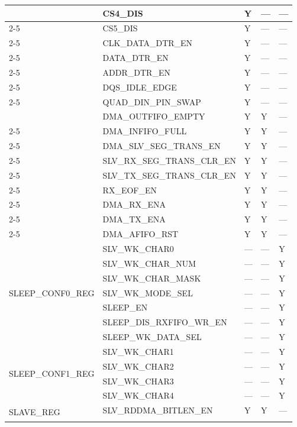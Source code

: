 \documentclass[main\_\_EN.tex]{subfiles}
\begin{document}
\begin{longtable}{|p{4.0cm}|p{6.5cm}|p{1.5cm}|p{1.5cm}|p{1.5cm}|}
& CS4\_DIS & Y & --- & --- \\ \cline{2-5}
& CS5\_DIS & Y & --- & --- \\ \cline{2-5}
& CLK\_DATA\_DTR\_EN & Y & --- & --- \\  \cline{2-5}
& DATA\_DTR\_EN & Y & --- & --- \\ \cline{2-5}
& ADDR\_DTR\_EN & Y & --- & --- \\ \cline{2-5}
& DQS\_IDLE\_EDGE & Y & --- & --- \\ \cline{2-5}
& QUAD\_DIN\_PIN\_SWAP & Y & --- & --- \\ \hline
\clearpage
\multirow{9}{*}{DMA\_CONF\_REG} & DMA\_OUTFIFO\_EMPTY & Y & Y & --- \\ \cline{2-5}
& DMA\_INFIFO\_FULL & Y & Y & --- \\ \cline{2-5}
& DMA\_SLV\_SEG\_TRANS\_EN & Y & Y & --- \\ \cline{2-5}
& SLV\_RX\_SEG\_TRANS\_CLR\_EN & Y & Y & --- \\ \cline{2-5}
& SLV\_TX\_SEG\_TRANS\_CLR\_EN & Y & Y & --- \\ \cline{2-5}
& RX\_EOF\_EN & Y & Y & --- \\ \cline{2-5}
& DMA\_RX\_ENA & Y & Y & --- \\ \cline{2-5}
& DMA\_TX\_ENA & Y & Y & --- \\ \cline{2-5}
& DMA\_AFIFO\_RST & Y & Y & --- \\ \hline
\multirow{7}{*}{SLEEP\_CONF0\_REG} & SLV\_WK\_CHAR0 & --- & --- & Y \\ \cline{2-5}
& SLV\_WK\_CHAR\_NUM & --- & --- & Y \\ \cline{2-5}
& SLV\_WK\_CHAR\_MASK & --- & --- & Y \\ \cline{2-5}
& SLV\_WK\_MODE\_SEL & --- & --- & Y \\ \cline{2-5}
& SLEEP\_EN & --- & --- & Y \\ \cline{2-5}
& SLEEP\_DIS\_RXFIFO\_WR\_EN & --- & --- & Y \\ \cline{2-5}
& SLEEP\_WK\_DATA\_SEL & --- & --- & Y \\ \hline
\multirow{4}{*}{SLEEP\_CONF1\_REG} & SLV\_WK\_CHAR1 & --- & --- & Y \\ \cline{2-5}
& SLV\_WK\_CHAR2 & --- & --- & Y \\ \cline{2-5}
& SLV\_WK\_CHAR3 & --- & --- & Y \\ \cline{2-5}
& SLV\_WK\_CHAR4 & --- & --- & Y \\ \hline
\multirow{6}{*}{SLAVE\_REG} & SLV\_RDDMA\_BITLEN\_EN & Y & Y & --- \\ \cline{2-5}

\end{longtable}
\end{document}
